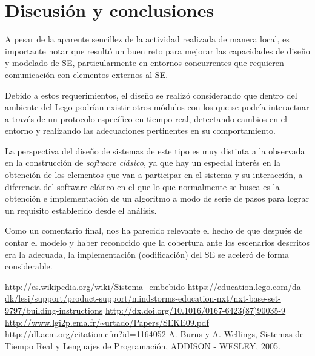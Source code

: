 \documentclass[journal]{IEEEtran}
\begin{document}
\section{Discusión y conclusiones}
\label{sec:discusion}
A pesar de la aparente sencillez de la actividad realizada de manera local, es importante notar que resultó un buen reto para mejorar las capacidades de diseño y modelado de SE, particularmente en entornos concurrentes que requieren comunicación con elementos externos al SE.

Debido a estos requerimientos, el diseño se realizó considerando que dentro del ambiente del Lego podrían existir otros módulos con los que se podría interactuar a través de un protocolo específico en tiempo real, detectando cambios en el entorno y realizando las adecuaciones pertinentes en su comportamiento.
 
La perspectiva del diseño de sistemas de este tipo es muy distinta a la observada en la construcción de \emph{software clásico}, ya que hay un especial interés en la obtención de los elementos que van a participar en el sistema y su interacción, a diferencia del software clásico en el que lo que normalmente se busca es la obtención e implementación de un algoritmo a modo de serie de pasos para lograr un requisito establecido desde el análisis.

Como un comentario final, nos ha parecido relevante el hecho de que después de contar el modelo y haber reconocido que la cobertura ante los escenarios descritos era la adecuada, la implementación (codificación) del SE se aceleró de forma considerable.

\begin{thebibliography}{00}

\url{http://es.wikipedia.org/wiki/Sistema_embebido}
\bibitem{}
\url{https://education.lego.com/da-dk/lesi/support/product-support/mindstorms-education-nxt/nxt-base-set-9797/building-instructions}
\bibitem{}
\url{http://dx.doi.org/10.1016/0167-6423(87)90035-9}
\bibitem{}
\url{http://www.lgi2p.ema.fr/~urtado/Papers/SEKE09.pdf}
\bibitem{}
\url{http://dl.acm.org/citation.cfm?id=1164052}
A. Burns y A. Wellings, Sistemas de Tiempo Real y Lenguajes de Programación, ADDISON - WESLEY, 2005.

\end{thebibliography}
\end{document}
